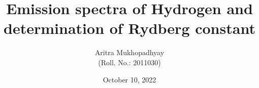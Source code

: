 \documentclass[10pt]{article}
\title{\textbf{Emission spectra of Hydrogen and\\determination of Rydberg constant}}
\author{Aritra Mukhopadhyay\\(Roll. No.: 2011030)}
\date{October 10, 2022}
\begin{document}
    \maketitle
    
    \begin{multicols*}{2}
        
        
        
        
        
        

        
        
        \nocite{*}
    \end{multicols*}
\end{document}
